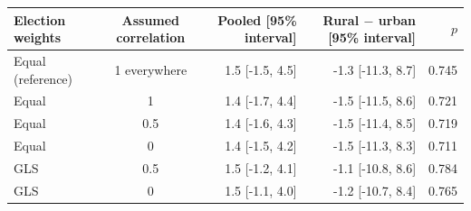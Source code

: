\begin{tabular}{lcrrr}
\toprule
Election weights & Assumed correlation & Pooled [95\% interval] & Rural $-$ urban [95\% interval] & $p$ \\
\midrule
Equal (reference) & 1 everywhere & 1.5 [-1.5, 4.5] & -1.3 [-11.3, 8.7] & 0.745 \\
Equal & 1 & 1.4 [-1.7, 4.4] & -1.5 [-11.5, 8.6] & 0.721 \\
Equal & 0.5 & 1.4 [-1.6, 4.3] & -1.5 [-11.4, 8.5] & 0.719 \\
Equal & 0 & 1.4 [-1.5, 4.2] & -1.5 [-11.3, 8.3] & 0.711 \\
GLS & 0.5 & 1.5 [-1.2, 4.1] & -1.1 [-10.8, 8.6] & 0.784 \\
GLS & 0 & 1.5 [-1.1, 4.0] & -1.2 [-10.7, 8.4] & 0.765 \\
\bottomrule
\end{tabular}
